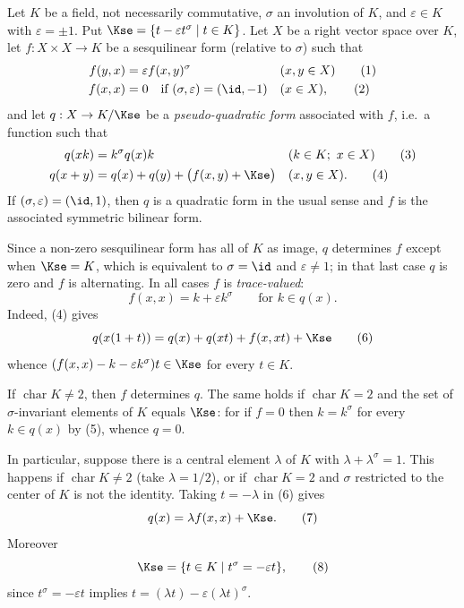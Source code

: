 \documentclass[12pt,a4paper,oneside,english]{smfart}
\theoremstyle{definition}
\theoremstyle{bt}
\begin{document}
Let $K$ be a field, not necessarily commutative, $\sigma$ an involution of $K$,
and $\varepsilon\in K$ with $\varepsilon=\pm 1$. Put
$\Kse=\{t-\varepsilon t^{\sigma}\mid t\in K\}$. Let $X$ be a right vector space
over $K$, let $f:X\times X\to K$ be a sesquilinear form (relative to $\sigma$)
such that
\begin{align}
f(y,x)&=\varepsilon f(x,y)^{\sigma} && (x,y\in X) \tag{1}\\
f(x,x)&=0 \quad\text{if } (\sigma,\varepsilon)=(\id,-1) && (x\in X), \tag{2}
\end{align}
and let $q:X\to K/\Kse$ be a \emph{pseudo-quadratic form} associated with $f$,
i.e.\ a function such that
\begin{align}
q(xk)&=k^{\sigma}q(x)k && (k\in K;\ x\in X) \tag{3}\\
q(x+y)&=q(x)+q(y)+\bigl(f(x,y)+\Kse\bigr) && (x,y\in X). \tag{4}
\end{align}
If $(\sigma,\varepsilon)=(\id,1)$, then $q$ is a quadratic form in the usual
sense and $f$ is the associated symmetric bilinear form.

Since a non-zero sesquilinear form has all of $K$ as image, $q$ determines $f$
except when $\Kse=K$, which is equivalent to $\sigma=\id$ and
$\varepsilon\neq 1$; in that last case $q$ is zero and $f$ is alternating. In
all cases $f$ is \emph{trace-valued}:
\begin{equation}
f(x,x)=k+\varepsilon k^{\sigma}\qquad\text{for } k\in q(x). \tag{5}
\end{equation}
Indeed, (4) gives
\begin{equation}
q(x(1+t))=q(x)+q(xt)+f(x,xt)+\Kse \tag{6}
\end{equation}
whence $(f(x,x)-k-\varepsilon k^{\sigma})t\in\Kse$ for every $t\in K$.

If $\operatorname{char}K\neq 2$, then $f$ determines $q$. The same holds if
$\operatorname{char}K=2$ and the set of $\sigma$-invariant elements of $K$
equals $\Kse$: for if $f=0$ then $k=k^{\sigma}$ for every $k\in q(x)$ by (5),
whence $q=0$.

In particular, suppose there is a central element $\lambda$ of $K$ with
$\lambda+\lambda^{\sigma}=1$. This happens if $\operatorname{char}K\neq2$
(take $\lambda=1/2$), or if $\operatorname{char}K=2$ and $\sigma$ restricted to
the center of $K$ is not the identity. Taking $t=-\lambda$ in (6) gives
\begin{equation}
q(x)=\lambda f(x,x)+\Kse . \tag{7}
\end{equation}
Moreover
\begin{equation}
\Kse=\{t\in K\mid t^{\sigma}=-\varepsilon t\}, \tag{8}
\end{equation}
since $t^{\sigma}=-\varepsilon t$ implies $t=(\lambda t)-\varepsilon(\lambda t)^{\sigma}$.
\end{document}
